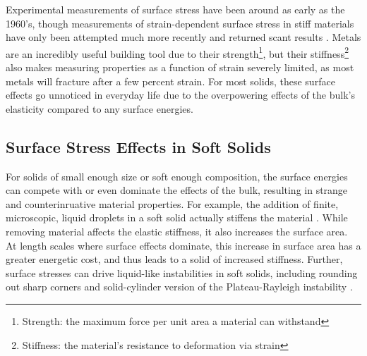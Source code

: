 Experimental measurements of surface stress have been around as early as the 1960's, though measurements of strain-dependent surface stress in stiff materials have only been attempted much more recently and returned scant results \cite{mays1968surface,wasserman1970determination,hanneman1962elastic,martinez1990direct,schell1990mechanical}. Metals are an incredibly useful building tool due to their strength\footnote{Strength: the maximum force per unit area a material can withstand}, but their stiffness\footnote{Stiffness: the material's resistance to deformation via strain} also makes measuring properties as a function of strain severely limited, as most metals will fracture after a few percent strain. For most solids, these surface effects go unnoticed in everyday life due to the overpowering effects of the bulk's elasticity compared to any surface energies. 



\subsection{Surface Stress Effects in Soft Solids}
For solids of small enough size or soft enough composition, the surface energies can compete with or even dominate the effects of the bulk, resulting in strange and counterinruative material properties. For example, the addition of finite, microscopic, liquid droplets in a soft solid actually stiffens the material \cite{style2015stiffening}. While removing material affects the elastic stiffness, it also increases the surface area. At length scales where surface effects dominate, this increase in surface area has a greater energetic cost, and thus leads to a solid of increased stiffness. Further, surface stresses can drive liquid-like instabilities in soft solids, including rounding out sharp corners \cite{mora2015softening} and solid-cylinder version of the Plateau-Rayleigh instability \cite{mora2010capillarity}.

